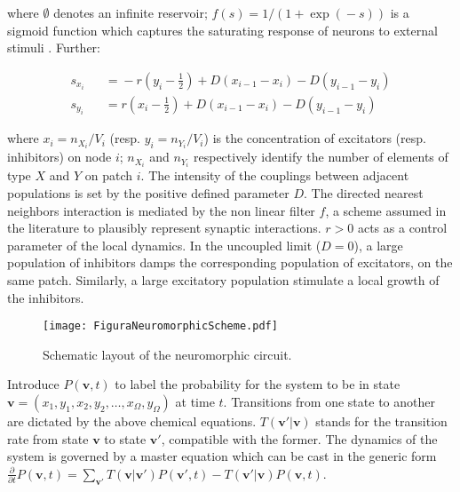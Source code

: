 \documentclass[showpacs,prl,superscriptaddress,nofootinbib, twocolumn]{revtex4}
\begin{document}
where $\emptyset$ denotes an infinite reservoir; $f(s)\!=\!1/(1\!+\!\exp (\!-\!s))$ is a sigmoid function which captures the saturating response of neurons to
external stimuli \cite{WC1,WC2, bressloff}. Further:   

\begin{eqnarray*}
s_{x_i}  &&\!=\!   \!-\! r \left(y_i\!-\! \frac{1}{2} \right)+{D \left( x_{i-1} \!-\! x_{i}\right)-D \left(y_{i-1}\!-\! y_{i} \right)} \\ 
s_{y_i}  &&\!=\!     r \left(x_i\!-\! \frac{1}{2} \right)+{D \left( x_{i-1} \!-\! x_{i}\right)-D \left(y_{i-1}\!-\! y_{i} \right)}
\end{eqnarray*}

where $x_i=n_{X_i}/V_i$ (resp. $y_i=n_{Y_i}/V_i$) is the concentration of excitators (resp. inhibitors) on node $i$; $n_{X_i}$ and $n_{Y_i}$
respectively identify the number of elements of type $X$ and $Y$ on patch $i$.  The  intensity of the couplings between adjacent populations is set by the positive defined parameter $D$. The 
directed nearest neighbors interaction is mediated by the non linear filter $f$, a scheme assumed in the literature to plausibly represent synaptic interactions. $r>0$ acts as a control parameter of the local dynamics. 
In the uncoupled limit ($D=0$), a large population of inhibitors damps the corresponding population of excitators, on the same patch. Similarly,  a large excitatory population stimulate a local growth of the inhibitors.   

\begin{figure}
 \centering
   {\texttt{[image: FiguraNeuromorphicScheme.pdf]}}
   \caption{Schematic layout of the neuromorphic circuit.}
   \label{fig1}
  \end{figure}

Introduce $P({\boldsymbol v},t)$ to label the probability for the system to be in state ${\boldsymbol v } \!=\! ({x_1},{y_1},{x_2},{y_2}, \ldots, {x_\Omega},{y_\Omega})$ at time $t$. Transitions from one state to another are dictated by the above chemical equations. $T({\boldsymbol v}' | {\boldsymbol v})$ stands for the transition rate from state  ${\boldsymbol v} $ to state ${\boldsymbol v} '$, compatible with the former. The dynamics of the 
system is governed by a master equation \cite{vankampen, gardiner} which can be cast in the generic form
$\frac{\partial}{\partial t} P({\boldsymbol v},t) \!=\! \sum_{\boldsymbol v'} T \left( {\boldsymbol v} | {\boldsymbol v'} \right) P({\boldsymbol v'},t)  \!-\! T \left( {\boldsymbol v} '| {\boldsymbol v }\right) P({\boldsymbol v},t)$.
\end{document}
